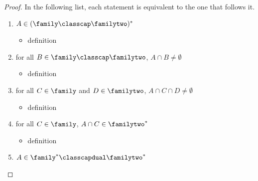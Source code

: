 \begin{proof}
    

    
    
     In the following list, each statement is equivalent to the one that follows it.
    \begin{enumerate}
        \item $A \in (\family \classcap \familytwo)^*$
        \begin{itemize}
            \item[--] definition
        \end{itemize}
        \item for all $B \in \family \classcap \familytwo$, $A \cap B \neq \emptyset$
        \begin{itemize}
            \item[--] definition
        \end{itemize}
        \item for all $C \in \family$ and $D \in \familytwo$, $A \cap C \cap D \neq \emptyset$
        \begin{itemize}
            \item[--] definition
        \end{itemize}
        \item for all $C \in \family$, $A \cap C \in \familytwo^*$
        \begin{itemize}
            \item[--] definition
        \end{itemize}
        \item $A \in \family^* \classcapdual \familytwo^*$
    \end{enumerate}
\end{proof}

